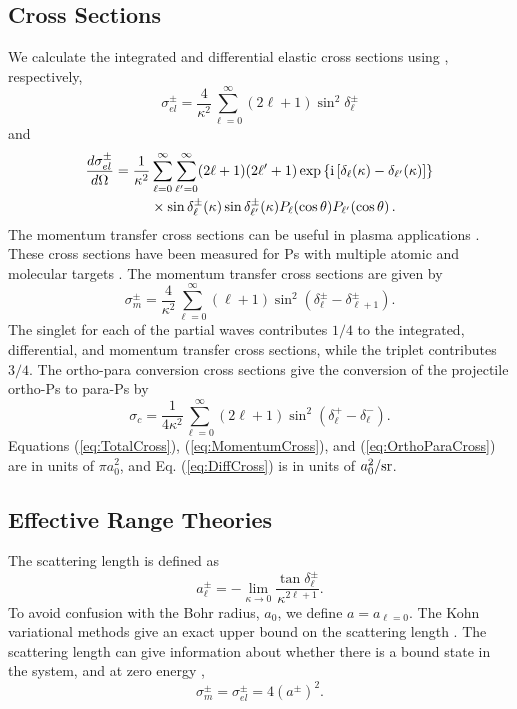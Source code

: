 \documentclass[preprint,showpacs,preprintnumbers,amsmath,amssymb,longbibliography,pra,aps]{revtex4-1}
\newcommand{\ii}{{\rm{i}}}
\begin{document}
\subsection{Cross Sections}
We calculate the integrated and differential elastic cross sections using \cite{Bransden2003}, respectively,
\begin{equation}
\label{eq:TotalCross}
\sigma_{el}^\pm = \frac{4}{\kappa^2} \sum_{\ell=0}^\infty (2\ell+1) \sin^2 \delta_\ell^\pm
\end{equation}
and
\begin{align}
\label{eq:DiffCross}
\nonumber \frac{d\sigma_{el}^\pm}{d\Omega} = \frac{1}{\kappa^2} & \sum_{\ell=0}^\infty \sum_{\ell^\prime=0}^\infty (2\ell+1)(2\ell^\prime+1) \exp\left\{\ii \left[\delta_\ell(\kappa) - \delta_{\ell^\prime}(\kappa) \right] \right\} \\
& \times \sin\delta_\ell^\pm(\kappa) \sin\delta_{\ell^\prime}^\pm(\kappa) P_\ell(\cos\theta) P_{\ell^\prime}(\cos\theta)\,.
\end{align}
The momentum transfer cross sections can be useful in plasma applications \cite{Wang2014, McEachran2014}. These cross sections have been measured for Ps with multiple atomic and molecular targets \cite{Nagashima1998,Saito2003}. The momentum transfer cross sections are given by \cite{Bransden2003}
\begin{equation}
\label{eq:MomentumCross}
\sigma_{m}^\pm = \frac{4}{\kappa^2} \sum_{\ell=0}^\infty (\ell+1) \sin^2 (\delta_\ell^\pm - \delta_{\ell+1}^\pm) .
\end{equation}
The singlet for each of the partial waves contributes $1/4$ to the integrated, differential, and momentum transfer cross sections, while the triplet contributes $3/4$.
The ortho-para conversion cross sections give the conversion of the projectile ortho-Ps to para-Ps by \cite{Hara1975}
\begin{equation}
\label{eq:OrthoParaCross}
\sigma_{c} = \frac{1}{4 \kappa^2} \sum_{\ell=0}^\infty (2 \ell+1) \sin^2 (\delta_\ell^+ - \delta_\ell^-).
\end{equation}
Equations (\ref{eq:TotalCross}), (\ref{eq:MomentumCross}), and (\ref{eq:OrthoParaCross}) are in units of $\pi a_0^2$, and Eq. (\ref{eq:DiffCross}) is in units of $a_0^2 / \rm{sr}$. 


\subsection{Effective Range Theories}

The scattering length is defined as \cite{Bransden2003}
\begin{equation}
\label{eq:ScatLen}
a_\ell^\pm = -\lim_{\kappa \to 0} \frac{\tan{\delta_\ell^\pm}}{\kappa^{2\ell+1}}.
\end{equation}
To avoid confusion with the Bohr radius, $a_0$, we define $a = a_{\ell=0}$. The Kohn variational methods give an exact upper bound on the scattering length \cite{Joachain1979}. The scattering length can give information about whether there is a bound state in the system, and at zero energy \cite{Buckman1989},
\begin{equation}
\label{eq:ScatLenCross}
\sigma_m^\pm = \sigma_{el}^\pm = 4 (a^\pm)^2 .
\end{equation}
\end{document}
